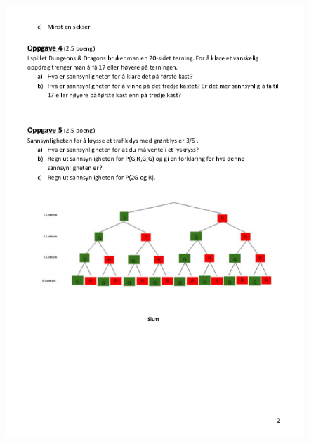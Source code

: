 \documentclass[main.tex]{subfiles}
\begin{document}
\begin{figure}[h!]
  \centering
  \includegraphics[width=.9\linewidth]{../figures/test2.png}
\end{figure}
\end{document}
